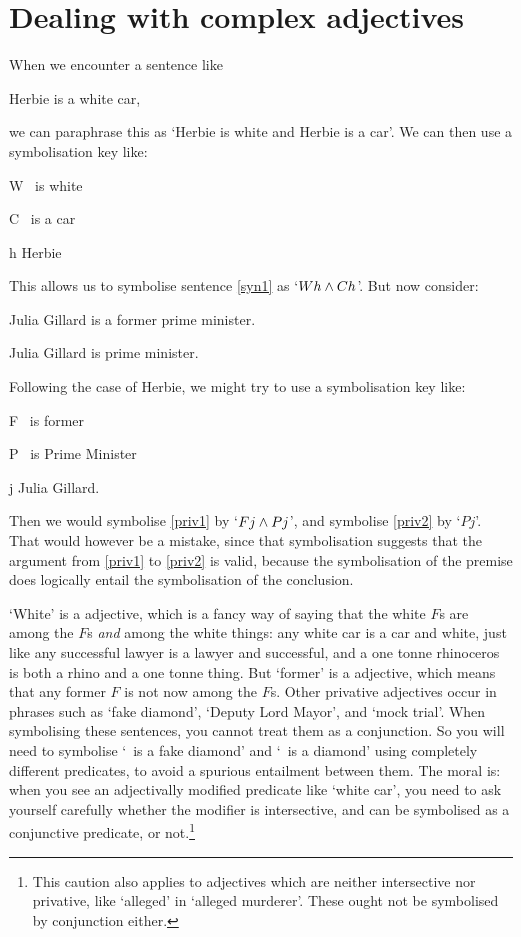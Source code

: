 \section{Dealing with complex adjectives%
}\label{s:complex_adj}
When we encounter a sentence like 
	\begin{earg}
		\item[\ex{syn1}] Herbie is a white car,
	\end{earg}
we can paraphrase this as `Herbie is white and Herbie is a car'. We can then use a symbolisation key like:
	\begin{ekey}
		\item[W] \blank\ is white
		\item[C] \blank\ is a car
		\item[h] Herbie
	\end{ekey}
This allows us to symbolise sentence \ref{syn1} as `$Wh \wedge Ch$'. But now consider:
\begin{earg}
	\item[\ex{priv1}] Julia Gillard is a former prime minister.
	\item[\ex{priv2}] Julia Gillard is prime minister.
\end{earg}
Following the case of Herbie, we might try to use a symbolisation key like:
	\begin{ekey}
		\item[F] \blank\ is former
		\item[P] \blank\ is Prime Minister
		\item[j] Julia Gillard.
	\end{ekey}
Then we would symbolise \ref{priv1} by `$Fj \wedge Pj$', and symbolise \ref{priv2} by `$Pj$'. That would however be a mistake, since that symbolisation suggests that the argument from \ref{priv1} to \ref{priv2} is valid, because the symbolisation of the premise does logically entail the symbolisation of the conclusion. 

`White' is a  adjective, which is a fancy way of saying that the white $F$s are among the $F$s \emph{and} among the white things: any white car is a car and white, just like any successful lawyer is a lawyer and successful, and a one tonne rhinoceros is both a rhino and a one tonne thing. But `former' is a  adjective, which means that any former $F$ is not now among the $F$s. Other privative adjectives occur in phrases such as `fake diamond', `Deputy Lord Mayor', and `mock trial'. When symbolising these sentences, you cannot treat them as a conjunction. So you will need to symbolise `\blank\ is a fake diamond' and `\blank\ is a diamond' using completely different predicates, to avoid a spurious entailment between them. The moral is: when you see an adjectivally modified predicate like `white car', you need to ask yourself carefully whether the modifier is intersective, and can be symbolised as a conjunctive predicate, or not.\footnote{This caution also applies to adjectives  which are neither intersective nor privative, like `alleged' in `alleged murderer'. These ought not be symbolised by conjunction either.}

